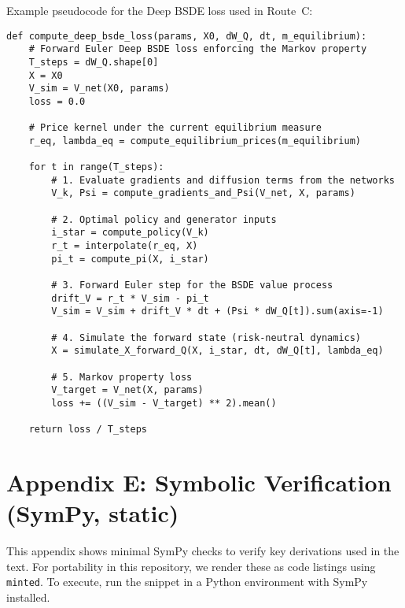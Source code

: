 \documentclass[11pt,letterpaper,oneside]{article}
\begin{document}
\noindent Example pseudocode for the Deep BSDE loss used in Route~C:
\begin{verbatim}
def compute_deep_bsde_loss(params, X0, dW_Q, dt, m_equilibrium):
    # Forward Euler Deep BSDE loss enforcing the Markov property
    T_steps = dW_Q.shape[0]
    X = X0
    V_sim = V_net(X0, params)
    loss = 0.0

    # Price kernel under the current equilibrium measure
    r_eq, lambda_eq = compute_equilibrium_prices(m_equilibrium)

    for t in range(T_steps):
        # 1. Evaluate gradients and diffusion terms from the networks
        V_k, Psi = compute_gradients_and_Psi(V_net, X, params)

        # 2. Optimal policy and generator inputs
        i_star = compute_policy(V_k)
        r_t = interpolate(r_eq, X)
        pi_t = compute_pi(X, i_star)

        # 3. Forward Euler step for the BSDE value process
        drift_V = r_t * V_sim - pi_t
        V_sim = V_sim + drift_V * dt + (Psi * dW_Q[t]).sum(axis=-1)

        # 4. Simulate the forward state (risk-neutral dynamics)
        X = simulate_X_forward_Q(X, i_star, dt, dW_Q[t], lambda_eq)

        # 5. Markov property loss
        V_target = V_net(X, params)
        loss += ((V_sim - V_target) ** 2).mean()

    return loss / T_steps
\end{verbatim}

\section{Appendix E: Symbolic Verification (SymPy, static)}\label{app:verification}

\noindent This appendix shows minimal SymPy checks to verify key derivations used in the text. For portability in this repository, we render these as code listings using \texttt{minted}. To execute, run the snippet in a Python environment with SymPy installed.
\end{document}

